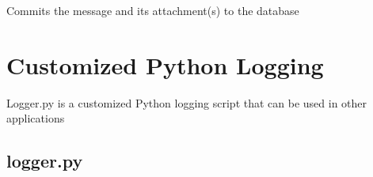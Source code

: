 \documentclass[letterpaper,10pt,english]{sphinxmanual}
\begin{document}
\begin{fulllineitems}
\begin{fulllineitems}
\end{fulllineitems}


\begin{fulllineitems}
\label{codedocs/database:database.toDB.toDB.close}
Commits the message and its attachment(s) to the database

\end{fulllineitems}


\end{fulllineitems}



\section{Customized Python Logging}
\label{codedocs/logs:customized-python-logging}\label{codedocs/logs::doc}\label{codedocs/logs:module-logs}
Logger.py is a customized Python logging script that can be used in other applications
\label{codedocs/logs:module-logs.logger}

\subsection{logger.py}
\label{codedocs/logs:module-logger}\label{codedocs/logs:logger-py}
\end{document}
